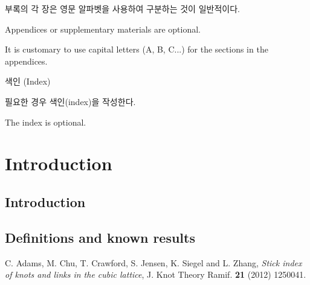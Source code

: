 \documentclass[11pt]{report}
\numberwithin{figure}{chapter}
\theoremstyle{plain}
\theoremstyle{definition}
\theoremstyle{corollary}
\theoremstyle{definition}
\theoremstyle{plain}
\theoremstyle{definition}
\theoremstyle{plain}
\begin{document}
부록의 각 장은 영문 알파벳을 사용하여 구분하는 것이 일반적이다.

Appendices or supplementary materials are optional.

It is customary to use capital letters (A, B, C...) for the sections in the appendices.

\newpage
\begin{center}
\large
색인 (Index)

\end{center}
\normalsize
필요한 경우 색인(index)을 작성한다.

The index is optional.




\newpage

\setcounter{page}{1} \setcounter{section}{0}
\chapter{Introduction} \label{chap:intro}


\section{Introduction} \label{sec:intro}


\section{Definitions and known results} \label{sec:def}


\newpage



\newpage

\begin{thebibliography}{AA}
 C. Adams, M. Chu, T. Crawford, S. Jensen, K. Siegel and L. Zhang,
    {\em Stick index of knots and links in the cubic lattice},
    J. Knot Theory Ramif. \textbf{21} (2012) 1250041.



\end{thebibliography}



%
%
%
%
%
\end{document}
